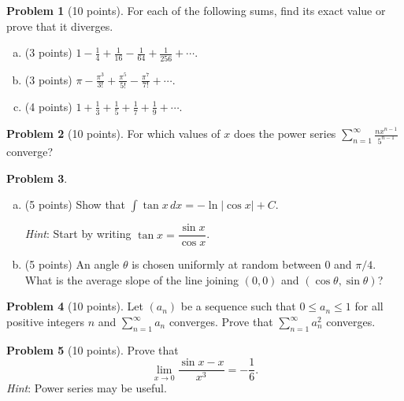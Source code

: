 \documentclass[11pt,oneside]{amsart}
\theoremstyle{definition}
\newtheorem{problem}{Problem}
\begin{document}
\newpage

\begin{problem}[10 points]
For each of the following sums, find its exact value or prove that it diverges.
\begin{enumerate}[(a)]
  \item (3 points) $\displaystyle 1-\frac 14+\frac 1{16}-\frac 1{64}+\frac 1{256}+\cdots$.
        \vfill
  \item (3 points) $\displaystyle\pi-\frac{\pi^3}{3!}+\frac{\pi^5}{5!}-\frac{\pi^7}{7!}+\cdots$.
        \vfill
  \item (4 points) $\displaystyle 1+\frac13+\frac 15+\frac 17+\frac19+\cdots$.
        \vfill
\end{enumerate}
\end{problem}

\newpage

\begin{problem}[10 points]
For which values of $x$ does the power series $\displaystyle \sum_{n=1}^\infty \frac{nx^{n-1}}{5^{n-1}}$ converge?
\end{problem}

\newpage

\begin{problem}
  \leavevmode\begin{enumerate}[(a)]
    \item (5 points) Show that $\displaystyle\int\tan x\,dx=-\ln|\cos x|+C$.
    
    \emph{Hint}: Start by writing $\tan x=\dfrac{\sin x}{\cos x}$.
    \vfill

    \item (5 points) An angle $\theta$ is chosen uniformly at random between 0 and $\pi/4$. What is the average slope of the line joining $(0,0)$ and $(\cos\theta,\sin\theta)$?
    \vfill
  \end{enumerate}
\end{problem}

\newpage

\begin{problem}[10 points]
Let $(a_n)$ be a sequence such that $0\leq a_n\leq 1$ for all positive integers $n$ and $\displaystyle\sum_{n=1}^\infty a_n$ converges. Prove that $\displaystyle\sum_{n=1}^\infty a_n^2$ converges.
\end{problem}

\newpage

\begin{problem}[10 points]
Prove that
\[\lim_{x\to 0}\frac{\sin x-x}{x^3}=-\frac16.\]
\emph{Hint}: Power series may be useful.
\end{problem}
\end{document}

